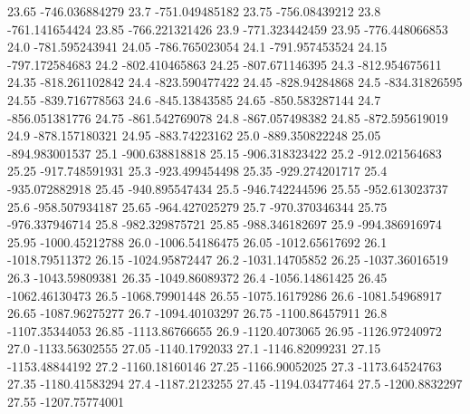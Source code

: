           23.65   -746.036884279
           23.7   -751.049485182
          23.75    -756.08439212
           23.8   -761.141654424
          23.85   -766.221321426
           23.9   -771.323442459
          23.95   -776.448066853
           24.0   -781.595243941
          24.05   -786.765023054
           24.1   -791.957453524
          24.15   -797.172584683
           24.2   -802.410465863
          24.25   -807.671146395
           24.3   -812.954675611
          24.35   -818.261102842
           24.4   -823.590477422
          24.45    -828.94284868
           24.5    -834.31826595
          24.55   -839.716778563
           24.6    -845.13843585
          24.65   -850.583287144
           24.7   -856.051381776
          24.75   -861.542769078
           24.8   -867.057498382
          24.85   -872.595619019
           24.9   -878.157180321
          24.95    -883.74223162
           25.0   -889.350822248
          25.05   -894.983001537
           25.1   -900.638818818
          25.15   -906.318323422
           25.2   -912.021564683
          25.25   -917.748591931
           25.3   -923.499454498
          25.35   -929.274201717
           25.4   -935.072882918
          25.45   -940.895547434
           25.5   -946.742244596
          25.55   -952.613023737
           25.6   -958.507934187
          25.65   -964.427025279
           25.7   -970.370346344
          25.75   -976.337946714
           25.8   -982.329875721
          25.85   -988.346182697
           25.9   -994.386916974
          25.95   -1000.45212788
           26.0   -1006.54186475
          26.05   -1012.65617692
           26.1   -1018.79511372
          26.15   -1024.95872447
           26.2   -1031.14705852
          26.25   -1037.36016519
           26.3   -1043.59809381
          26.35   -1049.86089372
           26.4   -1056.14861425
          26.45   -1062.46130473
           26.5   -1068.79901448
          26.55   -1075.16179286
           26.6   -1081.54968917
          26.65   -1087.96275277
           26.7   -1094.40103297
          26.75   -1100.86457911
           26.8   -1107.35344053
          26.85   -1113.86766655
           26.9    -1120.4073065
          26.95   -1126.97240972
           27.0   -1133.56302555
          27.05    -1140.1792033
           27.1   -1146.82099231
          27.15   -1153.48844192
           27.2   -1160.18160146
          27.25   -1166.90052025
           27.3   -1173.64524763
          27.35   -1180.41583294
           27.4    -1187.2123255
          27.45   -1194.03477464
           27.5    -1200.8832297
          27.55   -1207.75774001
